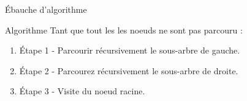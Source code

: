 \documentclass[10pt,xcolor=dvipsnames]{beamer}
\begin{document}
\begin{frame}{Ébauche d'algorithme}
    \begin{alertblock}{Algorithme}
    Tant que tout les les noeuds ne sont pas parcouru :
    \begin{enumerate}
        \item Étape 1 - Parcourir récursivement le sous-arbre de gauche.
        \item Étape 2 - Parcourez récursivement le sous-arbre de droite.
        \item Étape 3 - Visite du noeud racine.
    \end{enumerate}
    \end{alertblock}
\end{frame}
\end{document}
